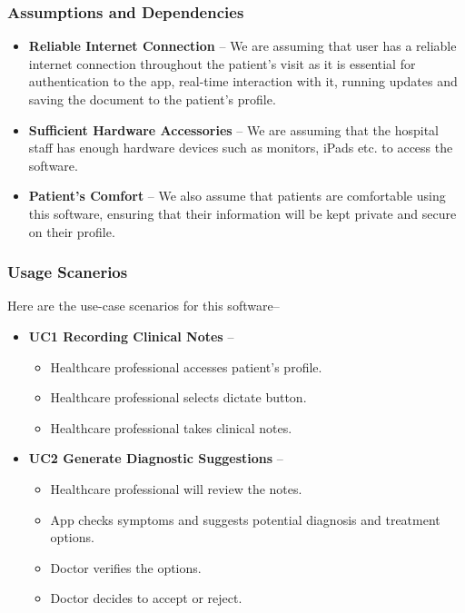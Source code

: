 \documentclass[12pt]{article}
\begin{document}
\subsubsection{Assumptions and Dependencies} \label{sec_assumpt}

\begin{itemize}
  \item\textbf{Reliable Internet Connection} -- We are assuming that user has a reliable internet connection throughout the patient’s visit as it is essential for authentication to the app, real-time interaction with it, running updates and saving the document to the patient’s profile.
  \item\textbf{Sufficient Hardware Accessories} -- We are assuming that the hospital staff has enough hardware devices such as monitors, iPads etc. to access the software.
  \item\textbf{Patient’s Comfort} -- We also assume that patients are comfortable using this software, ensuring that their information will be kept private and secure on their profile.
\end{itemize}

\subsubsection{Usage Scanerios}

Here are the use-case scenarios for this software--

\begin{itemize}
  \item\textbf{UC1 Recording Clinical Notes} --
  \begin{itemize}
    \item Healthcare professional accesses patient’s profile.
    \item Healthcare professional selects dictate button.
    \item Healthcare professional takes clinical notes.
  \end{itemize}
  \item\textbf{UC2 Generate Diagnostic Suggestions} --
  \begin{itemize}
    \item Healthcare professional will review the notes.
    \item App checks symptoms and suggests potential diagnosis and treatment options.
    \item Doctor verifies the options.
    \item Doctor decides to accept or reject.
  \end{itemize}
\end{itemize}
\end{document}

